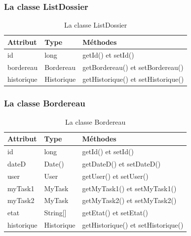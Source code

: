\subsubsection{La classe ListDossier}
\begin{table}[H]
	\centering\setlength\tabcolsep{0.8cm}
	
	\begin{tabular}{|l|l|l|}
		\hline
		\textbf{Attribut}  & \textbf{Type} & \multicolumn{1}{l|}{\textbf{Méthodes}} \\ \hline
		
		id & long & getId() et setId()\\ \cline{1-2}
		bordereau & Bordereau & getBordereau() et setBordereau()\\ \cline{1-2}
		historique & Historique & getHistorique() et setHistorique()\\   \hline
	\end{tabular}
	\caption{La classe ListDossier}
	\label{fig:class9}
\end{table}

\subsubsection{La classe Bordereau}
\begin{table}[H]
	\centering\setlength\tabcolsep{1cm}
	
	\begin{tabular}{|l|l|l|}
		\hline
		\textbf{Attribut}  & \textbf{Type} & \multicolumn{1}{l|}{\textbf{Méthodes}} \\ \hline
		
		id & long & getId() et setId()\\ \cline{1-2}
		dateD & Date() & getDateD() et setDateD()\\ \cline{1-2}
		
		user & User & getUser() et setUser()\\ \cline{1-2}
		myTask1 & MyTask  & getMyTask1() et setMyTask1()   \\ \cline{1-2}
		myTask2 & MyTask  & getMyTask2() et setMyTask2() \\ \cline{1-2}  
		etat & String[] & getEtat() et setEtat()\\ \cline{1-2}
		historique & Historique & getHistorique() et setHistorique()\\ \hline
	\end{tabular}
	\caption{La classe Bordereau}
	\label{fig:Bordereau}
\end{table}


